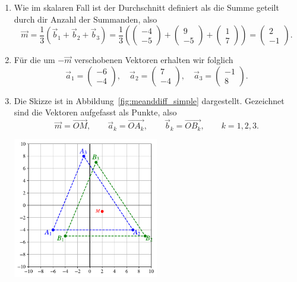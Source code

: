 \begin{losung}
	\begin{enumerate}[label=(\alph*)]
		\item Wie im skalaren Fall ist der Durchschnitt definiert als die Summe geteilt durch dir Anzahl der Summanden, also
		\begin{equation*}
			\vec{m}=\frac{1}{3}\left(\vec{b}_1+\vec{b}_2+\vec{b}_3\right)
			=\frac{1}{3}\left(
			\begin{pmatrix}
				-4 \\
				-5
			\end{pmatrix}+
			\begin{pmatrix}
				9 \\
				-5
			\end{pmatrix}+
			\begin{pmatrix}
				1 \\
				7
			\end{pmatrix}
			\right)
			=
			\begin{pmatrix}
				2 \\
				-1
			\end{pmatrix}.
		\end{equation*}
		\item Für die um $-\vec{m}$ verschobenen Vektoren erhalten wir folglich
		\begin{equation*}
			\vec{a}_1=
			\begin{pmatrix}
				-6 \\
				-4
			\end{pmatrix},\quad
			\vec{a}_2=
			\begin{pmatrix}
				7 \\
				-4
			\end{pmatrix},\quad
			\vec{a}_3=
			\begin{pmatrix}
				-1 \\
				8
			\end{pmatrix}.
		\end{equation*}
		\item Die Skizze ist in Abbildung~\ref{fig:meanddiff_simple} dargestellt.
			Gezeichnet sind die Vektoren aufgefasst als Punkte, also
			\begin{equation*}
				\vec{m}=\overrightarrow{OM},\qquad
				\vec{a}_k=\overrightarrow{OA_k},\qquad
				\vec{b}_k=\overrightarrow{OB_k},\qquad
				k=1,2,3.
			\end{equation*}
			\begin{center}
				\includegraphics[width=0.5\textwidth]{images/facespace/meandiff_simple}

\end{center}
\end{enumerate}
\end{losung}

